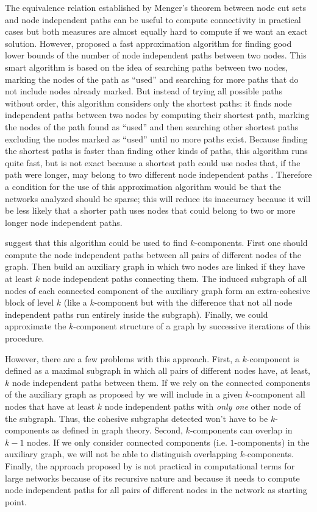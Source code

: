 The equivalence relation established by Menger's theorem between node cut sets and node independent paths can be useful to compute connectivity in practical cases but both measures are almost equally hard to compute if we want an exact solution. However, \citet{white:2001b} proposed a fast approximation algorithm for finding good lower bounds of the number of node independent paths between two nodes. This smart algorithm is based on the idea of searching paths between two nodes, marking the nodes of the path as ``used'' and searching for more paths that do not include nodes already marked. But instead of trying all possible paths without order, this algorithm considers only the shortest paths: it finds node independent paths between two nodes by computing their shortest path, marking the nodes of the path found as ``used'' and then searching other shortest paths excluding the nodes marked as ``used'' until no more paths exist. Because finding the shortest paths is faster than finding other kinds of paths, this algorithm runs quite fast, but is not exact because a shortest path could use nodes that, if the path were longer, may belong to two different node independent paths \citep[section III]{white:2001b}. Therefore a condition for the use of this approximation algorithm would be that the networks analyzed should be sparse; this will reduce its inaccuracy because it will be less likely that a shorter path uses nodes that could belong to two or more longer node independent paths.

\citeauthor{white:2001b} suggest that this algorithm could be used to find $k$-components.  First one should compute the node independent paths between all pairs of different nodes of the graph. Then build an auxiliary graph in which two nodes are linked if they have at least $k$ node independent paths connecting them. The induced subgraph of all nodes of each connected component of the auxiliary graph form an extra-cohesive block of level $k$ (like a $k$-component but with the difference that not all node independent paths run entirely inside the subgraph). Finally, we could approximate the $k$-component structure of a graph by successive iterations of this procedure.

However, there are a few problems with this approach. First, a $k$-component is defined as a maximal subgraph in which all pairs of different nodes have, at least, $k$ node independent paths between them. If we rely on the connected components of the auxiliary graph as proposed by \citet{white:2001b} we will include in a given $k$-component all nodes that have at least $k$ node independent paths with \emph{only one} other node of the subgraph. Thus, the cohesive subgraphs detected won't have to be $k$-components as defined in graph theory. Second, $k$-components can overlap in $k-1$ nodes. If we only consider connected components (i.e. $1$-components) in the auxiliary graph, we will not be able to distinguish overlapping $k$-components. Finally, the approach proposed by \citeauthor{white:2001b} is not practical in computational terms for large networks because of its recursive nature and because it needs to compute node independent paths for all pairs of different nodes in the network as starting point.

